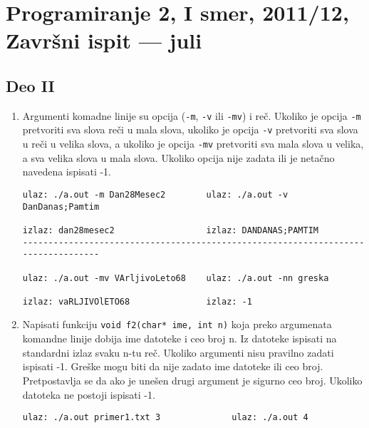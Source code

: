 \section{Programiranje 2, I smer, 2011/12, Zavr\v{s}ni ispit --- juli}

\subsection{Deo II}


\begin{enumerate}
\item Argumenti komadne linije su opcija (\verb|-m|, \verb|-v| ili \verb|-mv|) i re\v c.
Ukoliko je opcija \verb|-m| pretvoriti sva slova re\v ci u mala slova, ukoliko je opcija
\verb|-v| pretvoriti sva slova u re\v ci u velika slova, a ukoliko je opcija \verb|-mv|
pretvoriti sva mala slova u velika, a sva velika slova u mala slova. Ukoliko opcija nije zadata
ili je neta\v cno navedena ispisati -1.

\begin{small}
\begin{verbatim}
ulaz: ./a.out -m Dan28Mesec2        ulaz: ./a.out -v DanDanas;Pamtim

izlaz: dan28mesec2                  izlaz: DANDANAS;PAMTIM
----------------------------------------------------------------------------------

ulaz: ./a.out -mv VArljivoLeto68    ulaz: ./a.out -nn greska

izlaz: vaRLJIVOlETO68               izlaz: -1

\end{verbatim}
\end{small}


\item Napisati funkciju \verb|void f2(char* ime, int n)| koja preko argumenata komandne linije dobija
ime datoteke i ceo broj n. Iz datoteke ispisati na standardni izlaz svaku n-tu re\v c. Ukoliko
argumenti nisu pravilno zadati ispisati -1. Gre\v ske mogu biti da nije zadato ime datoteke
ili ceo broj. Pretpostavlja se da ako je une\v sen drugi argument je sigurno ceo broj.
Ukoliko datoteka ne postoji ispisati -1.


\begin{small}
\begin{verbatim}
ulaz: ./a.out primer1.txt 3              ulaz: ./a.out 4


\end{verbatim}
\end{small}
\end{enumerate}
